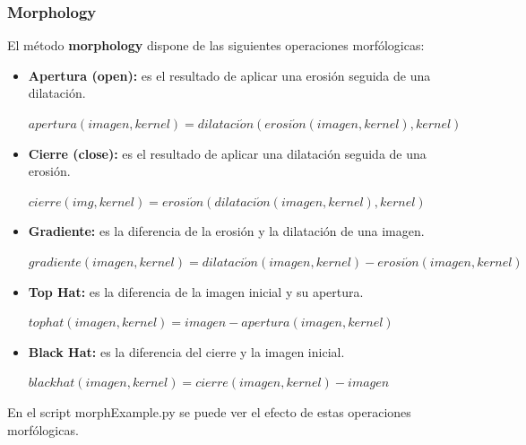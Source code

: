 \documentclass[a4paper,12pt]{article}
\begin{document}
\subsubsection{Morphology}
\label{sec:morph}
El método \textbf{morphology} dispone de las siguientes operaciones morfólogicas:
\begin{itemize}
\item \textbf{Apertura (open): } es el resultado de aplicar una erosión seguida de una dilatación.
\begin{center}
$apertura(imagen, kernel) = dilataci\acute{o}n(erosi\acute{o}n(imagen,kernel), kernel)$
\end{center}
\item \textbf{Cierre (close):} es el resultado de aplicar una dilatación seguida de una erosión.
\begin{center}
$cierre(img, kernel) = erosi\acute{o}n(dilataci\acute{o}n(imagen,kernel),kernel)$
\end{center}
\item \textbf{Gradiente:} es la diferencia de la erosión y la dilatación de una imagen.
\begin{center}
$gradiente(imagen, kernel) = dilataci\acute{o}n(imagen,kernel) - erosi\acute{o}n(imagen,kernel)$
\end{center}
\item \textbf{Top Hat:} es la diferencia de la imagen inicial y su apertura.
\begin{center}
$tophat(imagen, kernel) = imagen - apertura(imagen, kernel)$
\end{center}
\item \textbf{Black Hat:} es la diferencia del cierre y la imagen inicial.
\begin{center}
$blackhat(imagen, kernel) = cierre(imagen, kernel)- imagen$
\end{center}
\end{itemize}

En el script morphExample.py se puede ver el efecto de estas operaciones morfólogicas.
\end{document}

